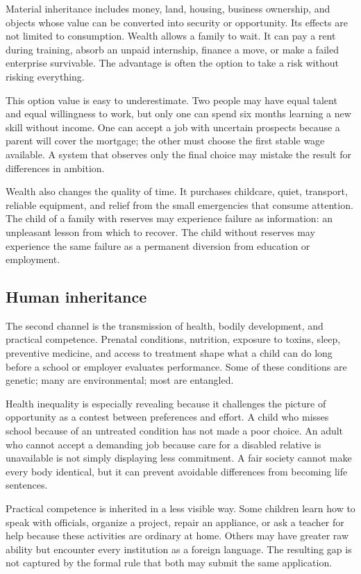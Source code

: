 ﻿\documentclass[12pt,a4paper]{book}
\begin{document}
Material inheritance includes money, land, housing, business ownership,
and objects whose value can be converted into security or opportunity.  Its
effects are not limited to consumption.  Wealth allows a family to wait. It
can pay a rent during training, absorb an unpaid internship, finance a move,
or make a failed enterprise survivable.  The advantage is often the option
to take a risk without risking everything.

This option value is easy to underestimate.  Two people may have equal
talent and equal willingness to work, but only one can spend six months
learning a new skill without income.  One can accept a job with uncertain
prospects because a parent will cover the mortgage; the other must choose
the first stable wage available.  A system that observes only the final
choice may mistake the result for differences in ambition.

Wealth also changes the quality of time.  It purchases childcare, quiet,
transport, reliable equipment, and relief from the small emergencies that
consume attention.  The child of a family with reserves may experience
failure as information: an unpleasant lesson from which to recover.  The
child without reserves may experience the same failure as a permanent
diversion from education or employment.

\subsection{Human inheritance}

The second channel is the transmission of health, bodily development, and
practical competence.  Prenatal conditions, nutrition, exposure to toxins,
sleep, preventive medicine, and access to treatment shape what a child can
do long before a school or employer evaluates performance.  Some of these
conditions are genetic; many are environmental; most are entangled.

Health inequality is especially revealing because it challenges the picture
of opportunity as a contest between preferences and effort.  A child who
misses school because of an untreated condition has not made a poor choice.
An adult who cannot accept a demanding job because care for a disabled
relative is unavailable is not simply displaying less commitment.  A fair
society cannot make every body identical, but it can prevent avoidable
differences from becoming life sentences.

Practical competence is inherited in a less visible way.  Some children
learn how to speak with officials, organize a project, repair an appliance,
or ask a teacher for help because these activities are ordinary at home.
Others may have greater raw ability but encounter every institution as a
foreign language.  The resulting gap is not captured by the formal rule
that both may submit the same application.
\end{document}
